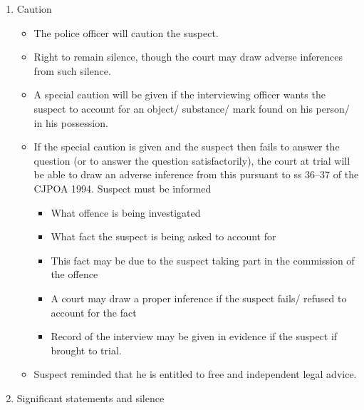 \documentclass[
]{article}
\providecommand{\tightlist}{%
  \setlength{\itemsep}{0pt}\setlength{\parskip}{0pt}}
\begin{document}
\begin{enumerate}
\def\labelenumi{\arabic{enumi}.}
\tightlist
\item
  Caution

  \begin{itemize}
  \tightlist
  \item
    The police officer will caution the suspect.
  \item
    Right to remain silence, though the court may draw adverse
    inferences from such silence.
  \item
    A special caution will be given if the interviewing officer wants
    the suspect to account for an object/ substance/ mark found on his
    person/ in his possession.
  \item
    If the special caution is given and the suspect then fails to answer
    the question (or to answer the question satisfactorily), the court
    at trial will be able to draw an adverse inference from this
    pursuant to ss 36--37 of the CJPOA 1994. Suspect must be informed

    \begin{itemize}
    \tightlist
    \item
      What offence is being investigated
    \item
      What fact the suspect is being asked to account for
    \item
      This fact may be due to the suspect taking part in the commission
      of the offence
    \item
      A court may draw a proper inference if the suspect fails/ refused
      to account for the fact
    \item
      Record of the interview may be given in evidence if the suspect if
      brought to trial.
    \end{itemize}
  \item
    Suspect reminded that he is entitled to free and independent legal
    advice.
  \end{itemize}
\item
  Significant statements and silence


\end{enumerate}
\end{document}
